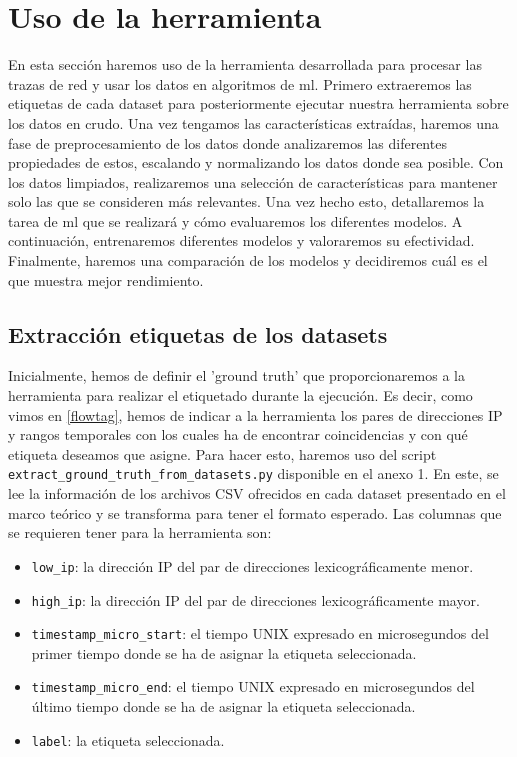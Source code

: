 \section{Uso de la herramienta}

En esta sección haremos uso de la herramienta desarrollada para procesar las trazas de red y usar los datos en algoritmos de \gls{ml}. Primero extraeremos las etiquetas de cada dataset para posteriormente ejecutar nuestra herramienta sobre los datos en crudo. Una vez tengamos las características extraídas, haremos una fase de preprocesamiento de los datos donde analizaremos las diferentes propiedades de estos, escalando y normalizando los datos donde sea posible. Con los datos limpiados, realizaremos una selección de características para mantener solo las que se consideren más relevantes. Una vez hecho esto, detallaremos la tarea de \gls{ml} que se realizará y cómo evaluaremos los diferentes modelos. A continuación, entrenaremos diferentes modelos y valoraremos su efectividad. Finalmente, haremos una comparación de los modelos y decidiremos cuál es el que muestra mejor rendimiento.

\subsection{Extracción etiquetas de los datasets}

Inicialmente, hemos de definir el 'ground truth' que proporcionaremos a la herramienta para realizar el etiquetado durante la ejecución. Es decir, como vimos en \ref{flowtag}, hemos de indicar a la herramienta los pares de direcciones IP y rangos temporales con los cuales ha de encontrar coincidencias y con qué etiqueta deseamos que asigne. Para hacer esto, haremos uso del script \texttt{extract\-\_ground\-\_truth\-\_from\-\_datasets.py} disponible en el anexo 1. En este, se lee la información de los archivos CSV ofrecidos en cada dataset presentado en el marco teórico y se transforma para tener el formato esperado. Las columnas que se requieren tener para la herramienta son:

\begin{itemize}
    \item \texttt{low\_ip}: la dirección IP del par de direcciones lexicográficamente menor.
    \item \texttt{high\_ip}: la dirección IP del par de direcciones lexicográficamente mayor.
    \item \texttt{timestamp\_micro\_start}: el tiempo UNIX expresado en microsegundos del primer tiempo donde se ha de asignar la etiqueta seleccionada.
    \item \texttt{timestamp\_micro\_end}:  el tiempo UNIX expresado en microsegundos del último tiempo donde se ha de asignar la etiqueta seleccionada.
    \item \texttt{label}: la etiqueta seleccionada.
\end{itemize}

